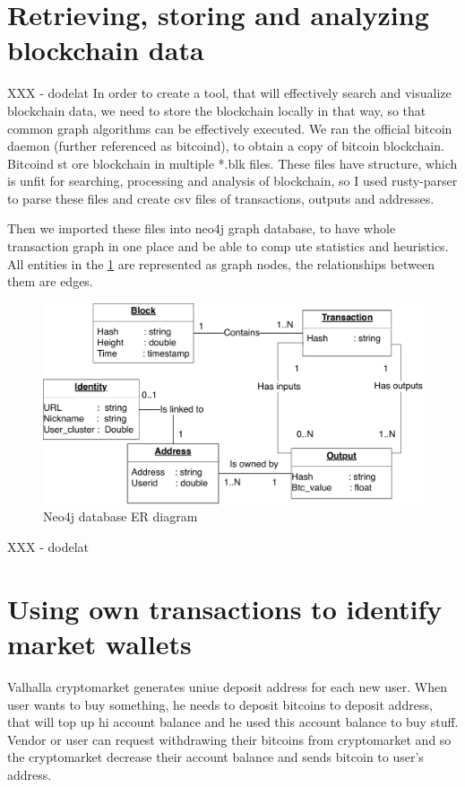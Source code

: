 \documentclass[
  digital, %
  table,   %
  lof,     %
  lot,     %
  oneside
]{fithesis3}
\begin{document}
\section{Retrieving, storing and analyzing blockchain data}
XXX - dodelat
In order to create a tool, that will effectively search and visualize blockchain data,
we need to store the blockchain locally in that way, so that common graph algorithms can be effectively executed.
We ran the official bitcoin daemon (further referenced as bitcoind), to obtain a copy of bitcoin blockchain. Bitcoind st
ore blockchain in multiple *.blk files.
These files have structure, which is unfit for searching, processing and analysis of blockchain, so I used rusty-parser 
to parse these files and create csv files of transactions, outputs and addresses.

Then we imported these files into neo4j graph database, to have whole transaction graph in one place and be able to comp
ute statistics and heuristics.
All entities in the \ref{neo4jschema} are represented as graph nodes, the relationships between them are edges.
\begin{figure}[!htb]
    \centering
    \includegraphics[width=1\textwidth]{neo4j-schema}
    \caption{Neo4j database ER diagram}
    \label{neo4jschema}
\end{figure}
XXX - dodelat

\section{Using own transactions to identify market wallets}
\label{Using own transactions to identify market wallets}

Valhalla cryptomarket generates uniue deposit address for each new user.
When user wants to buy something, he needs to deposit bitcoins to deposit address,
that will top up hi account balance and he used this account balance to buy stuff.
Vendor or user can request withdrawing their bitcoins from cryptomarket and so
the cryptomarket decrease their account balance and sends bitcoin to user's address.
\end{document}
